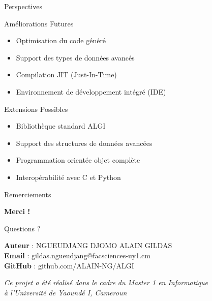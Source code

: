\documentclass[10pt]{beamer}
\begin{document}
\begin{frame}{Perspectives}
    \begin{block}{Améliorations Futures}
        \begin{itemize}
            \item Optimisation du code généré
            \item Support des types de données avancés
            \item Compilation JIT (Just-In-Time)
            \item Environnement de développement intégré (IDE)
        \end{itemize}
    \end{block}
    
    \begin{block}{Extensions Possibles}
        \begin{itemize}
            \item Bibliothèque standard ALGI
            \item Support des structures de données avancées
            \item Programmation orientée objet complète
            \item Interopérabilité avec C et Python
        \end{itemize}
    \end{block}
\end{frame}

\begin{frame}{Remerciements}
    \begin{center}
        \Huge{\textbf{Merci !}}
        
        \vspace{1cm}
        \Large{Questions ?}
        
        \vspace{1cm}
        \normalsize{
            \textbf{Auteur} : NGUEUDJANG DJOMO ALAIN GILDAS\\
            \textbf{Email} : gildas.ngueudjang@facsciences-uy1.cm\\
            \textbf{GitHub} : github.com/ALAIN-NG/ALGI
        }
        
        \vspace{0.5cm}
        \small{
            \textit{Ce projet a été réalisé dans le cadre du Master 1 en Informatique}\\
            \textit{à l'Université de Yaoundé I, Cameroun}
        }
    \end{center}
\end{frame}
\end{document}
